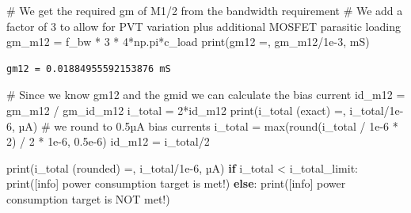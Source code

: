\documentclass[
  a4paper,
  DIV=11,
  numbers=noendperiod]{scrartcl}
\newenvironment{Shaded}{\begin{snugshade}}{\end{snugshade}}
\newcommand{\BuiltInTok}[1]{\textcolor[rgb]{0.00,0.23,0.31}{#1}}
\newcommand{\CommentTok}[1]{\textcolor[rgb]{0.37,0.37,0.37}{#1}}
\newcommand{\ControlFlowTok}[1]{\textcolor[rgb]{0.00,0.23,0.31}{\textbf{#1}}}
\newcommand{\DecValTok}[1]{\textcolor[rgb]{0.68,0.00,0.00}{#1}}
\newcommand{\FloatTok}[1]{\textcolor[rgb]{0.68,0.00,0.00}{#1}}
\newcommand{\NormalTok}[1]{\textcolor[rgb]{0.00,0.23,0.31}{#1}}
\newcommand{\OperatorTok}[1]{\textcolor[rgb]{0.37,0.37,0.37}{#1}}
\newcommand{\StringTok}[1]{\textcolor[rgb]{0.13,0.47,0.30}{#1}}
\begin{document}
\begin{tcolorbox}
\begin{Shaded}
\begin{Highlighting}[]
\CommentTok{\# We get the required gm of M1/2 from the bandwidth requirement}
\CommentTok{\# We add a factor of 3 to allow for PVT variation plus additional MOSFET parasitic loading}
\NormalTok{gm\_m12 }\OperatorTok{=}\NormalTok{ f\_bw }\OperatorTok{*} \DecValTok{3} \OperatorTok{*} \DecValTok{4}\OperatorTok{*}\NormalTok{np.pi}\OperatorTok{*}\NormalTok{c\_load}
\BuiltInTok{print}\NormalTok{(}\StringTok{\textquotesingle{}gm12 =\textquotesingle{}}\NormalTok{, gm\_m12}\OperatorTok{/}\FloatTok{1e{-}3}\NormalTok{, }\StringTok{\textquotesingle{}mS\textquotesingle{}}\NormalTok{)}
\end{Highlighting}
\end{Shaded}

\begin{verbatim}
gm12 = 0.01884955592153876 mS
\end{verbatim}

\begin{Shaded}
\begin{Highlighting}[]
\CommentTok{\# Since we know gm12 and the gmid we can calculate the bias current}
\NormalTok{id\_m12 }\OperatorTok{=}\NormalTok{ gm\_m12 }\OperatorTok{/}\NormalTok{ gm\_id\_m12}
\NormalTok{i\_total }\OperatorTok{=} \DecValTok{2}\OperatorTok{*}\NormalTok{id\_m12}
\BuiltInTok{print}\NormalTok{(}\StringTok{\textquotesingle{}i\_total (exact) =\textquotesingle{}}\NormalTok{, i\_total}\OperatorTok{/}\FloatTok{1e{-}6}\NormalTok{, }\StringTok{\textquotesingle{}µA\textquotesingle{}}\NormalTok{)}
\CommentTok{\# we round to 0.5µA bias currents}
\NormalTok{i\_total }\OperatorTok{=} \BuiltInTok{max}\NormalTok{(}\BuiltInTok{round}\NormalTok{(i\_total }\OperatorTok{/} \FloatTok{1e{-}6} \OperatorTok{*} \DecValTok{2}\NormalTok{) }\OperatorTok{/} \DecValTok{2} \OperatorTok{*} \FloatTok{1e{-}6}\NormalTok{, }\FloatTok{0.5e{-}6}\NormalTok{)}
\NormalTok{id\_m12 }\OperatorTok{=}\NormalTok{ i\_total}\OperatorTok{/}\DecValTok{2}

\BuiltInTok{print}\NormalTok{(}\StringTok{\textquotesingle{}i\_total (rounded) =\textquotesingle{}}\NormalTok{, i\_total}\OperatorTok{/}\FloatTok{1e{-}6}\NormalTok{, }\StringTok{\textquotesingle{}µA\textquotesingle{}}\NormalTok{)}
\ControlFlowTok{if}\NormalTok{ i\_total }\OperatorTok{\textless{}}\NormalTok{ i\_total\_limit:}
    \BuiltInTok{print}\NormalTok{(}\StringTok{\textquotesingle{}[info] power consumption target is met!\textquotesingle{}}\NormalTok{)}
\ControlFlowTok{else}\NormalTok{:}
    \BuiltInTok{print}\NormalTok{(}\StringTok{\textquotesingle{}[info] power consumption target is NOT met!\textquotesingle{}}\NormalTok{) }
\end{Highlighting}
\end{Shaded}


\end{tcolorbox}
\end{document}
